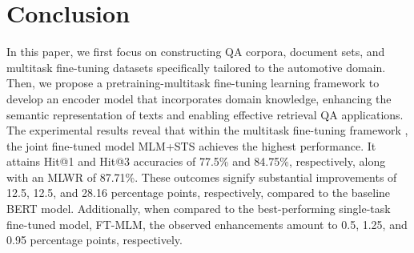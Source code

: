\documentclass[mathematics,article,submit,moreauthors]{Definitions/mdpi}
\newcommand{\1}[1]{\mathds{1}\left[#1\right]}
\providecommand{\DIFadd}[1]{{\protect\color{blue}\uwave{#1}}} %
\providecommand{\DIFaddbegin}{} %
\providecommand{\DIFaddend}{} %
\begin{document}
\DIFaddend \section{Conclusion}
In this paper, we first focus on constructing QA corpora, document sets, and multitask fine-tuning datasets specifically tailored to the automotive domain. Then, we propose a pretraining-multitask fine-tuning learning framework to develop an encoder model that incorporates domain knowledge, enhancing the semantic representation of texts and enabling effective retrieval QA applications. The experimental results reveal that within the multitask fine-tuning framework \DIFaddbegin \DIFadd{(based on $\text{BERT}_{base}$)}\DIFaddend , the joint fine-tuned model MLM+STS achieves the highest performance. It attains Hit@1 and Hit@3 accuracies of 77.5\% and 84.75\%, respectively, along with an MLWR of 87.71\%. These outcomes signify substantial improvements of 12.5, 12.5, and 28.16 percentage points, respectively, compared to the baseline BERT model. Additionally, when compared to the best-performing single-task fine-tuned model, FT-MLM, the observed enhancements amount to 0.5, 1.25, and 0.95 percentage points, respectively.


%

%


\vspace{6pt} 

\end{document}
